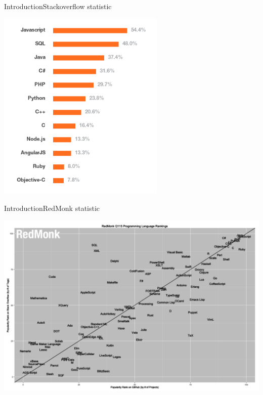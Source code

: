 \documentclass[10pt]{beamer}
\begin{document}
\begin{frame}{Introduction}{Stackoverflow statistic}
	\begin{center}
		\includegraphics[width=0.6\textwidth]{pictures/stackoverflow.jpg}
	\end{center}
\end{frame}

\begin{frame}{Introduction}{RedMonk statistic}
	\begin{center}
		\includegraphics[width=1\textwidth]{pictures/red_monk.png}
	\end{center}
\end{frame}
\end{document}
